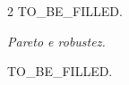 \documentclass[10pt,a4paper]{article}
\newcommand{\tabelanota}[1]{%
  \par
  \noindent
  {\fontsize{8}{9}\selectfont #1}
  \par
}
\begin{document}
\begin{multicols}{2}
TO\_BE\_FILLED.

%


\textit{Pareto e robustez.}

TO\_BE\_FILLED.

%
%


%
%
%
%
%

%
%


%
%
%
%
%

%
%
%
%
%




\end{multicols}
\end{document}
